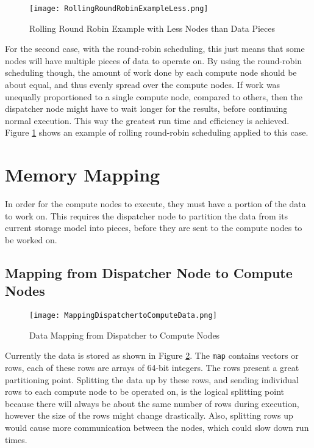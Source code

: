\begin{figure}[htp]
\centering
\texttt{[image: RollingRoundRobinExampleLess.png]}
\caption{Rolling Round Robin Example with Less Nodes than Data Pieces}
\label{fig:RollingRoundRobinExampleLess}
\end{figure}
For the second case, with the round-robin scheduling, this just means that some nodes will have multiple pieces of data to operate on. By using the round-robin scheduling though, the amount of work done by each compute node should be about equal, and thus evenly spread over the compute nodes. If work was unequally proportioned to a single compute node, compared to others, then the dispatcher node might have to wait longer for the results, before continuing normal execution. This way the greatest run time and efficiency is achieved. Figure \ref{fig:RollingRoundRobinExampleLess} shows an example of rolling round-robin scheduling applied to this case.

\section{Memory Mapping} \label{sec:DistributedMemoryMapping}
In order for the compute nodes to execute, they must have a portion of the data to work on. This requires the dispatcher node to partition the data from its current storage model into pieces, before they are sent to the compute nodes to be worked on.

\subsection{Mapping from Dispatcher Node to Compute Nodes}
\begin{figure}[htp]
\centering
\texttt{[image: MappingDispatchertoComputeData.png]}
\caption{Data Mapping from Dispatcher to Compute Nodes}
\label{fig:MappingDispatcherToComputeData}
\end{figure}
Currently the data is stored as shown in Figure \ref{fig:MappingDispatcherToComputeData}. The \verb|map| contains vectors or rows, each of these rows are arrays of 64-bit integers. The rows present a great partitioning point. Splitting the data up by these rows, and sending individual rows to each compute node to be operated on, is the logical splitting point because there will always be about the same number of rows during execution, however the size of the rows might change drastically. Also, splitting rows up would cause more communication between the nodes, which could slow down run times. 

